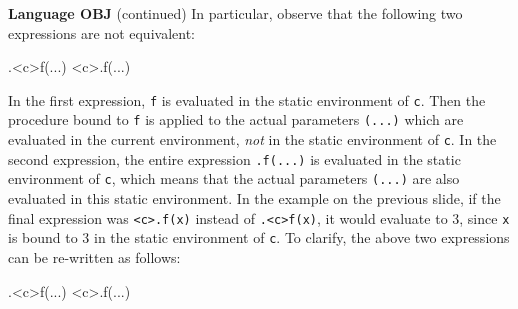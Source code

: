 \begin{minipage}[t]{\sw}
\slidenumber
\LARGE
{\bf Language OBJ} (continued)\exx
In particular, observe that 
the following two expressions are not equivalent:
\begin{qv}
.<c>f(...)
<c>.f(...)
\end{qv}
In the first expression, \verb'f' is evaluated
in the static environment of \verb'c'.
Then the procedure bound to \verb'f' is applied
to the actual parameters \verb'(...)'
which are evaluated in the current environment,
{\em not} in the static environment of \verb'c'.\exx
In the second expression, the entire expression
\verb'.f(...)' is evaluated in the static environment of \verb'c',
which means that the actual parameters \verb'(...)'
are also evaluated in this static environment.\exx
In the example on the previous slide,
if the final expression was \verb'<c>.f(x)' instead of \verb'.<c>f(x)',
it would evaluate to 3,
since \verb'x' is bound to 3 in the static environment of \verb'c'.\exx
To clarify, the above two expressions can be re-written as follows:
\begin{qv}
.{<c>f}(...)
<c>{.f(...)}
\end{qv}
\end{minipage}
